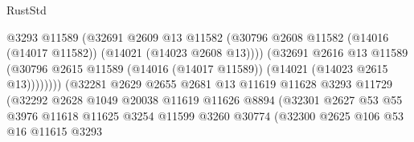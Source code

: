 \begin{lexlean}{RustStd}
\begin{coremodule}
                                          @3293
                                          @11589
                                          (@32691
                                            @2609
                                            @13
                                            @11582
                                            (@30796
                                              @2608
                                              @11582
                                              (@14016 (@14017 @11582))
                                              (@14021 (@14023 @2608 @13))))
                                          (@32691
                                            @2616
                                            @13
                                            @11589
                                            (@30796
                                              @2615
                                              @11589
                                              (@14016 (@14017 @11589))
                                              (@14021 (@14023 @2615 @13))))))))
                                  (@32281
                                    @2629
                                    @2655
                                    @2681
                                    @13
                                    @11619
                                    @11628
                                    @3293
                                    @11729
                                    (@32292
                                      @2628
                                      @1049
                                      @20038
                                      @11619
                                      @11626
                                      @8894
                                      (@32301
                                        @2627
                                        @53
                                        @55
                                        @3976
                                        @11618
                                        @11625
                                        @3254
                                        @11599
                                        @3260
                                        @30774
                                        (@32300
                                          @2625
                                          @106
                                          @53
                                          @16
                                          @11615
                                          @3293

\end{coremodule}
\end{lexlean}

